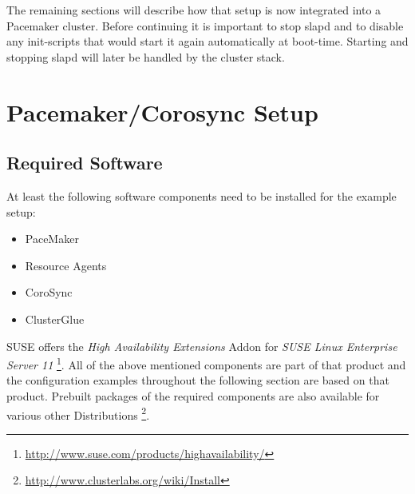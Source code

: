 \documentclass[a4paper,11pt,DIV=12]{scrartcl}
\begin{document}
    The remaining sections will describe how that setup is now integrated into
    a Pacemaker cluster. Before continuing it is important to stop slapd and to
    disable any init-scripts that would start it again automatically at
    boot-time.  Starting and stopping slapd will later be handled by the
    cluster stack.

\section{Pacemaker/Corosync Setup}

\subsection{Required Software}
    At least the following software components need to be installed for the
    example setup:
    \begin{itemize}
        \item PaceMaker
        \item Resource Agents
        \item CoroSync
        \item ClusterGlue
    \end{itemize}
    SUSE offers the \emph{High Availability Extensions} Addon for
    \emph{SUSE Linux Enterprise Server 11}
    \footnote{\url{http://www.suse.com/products/highavailability/}}. All
    of the above mentioned components are part of that product and the
    configuration examples  throughout the following section are based on
    that product.
    Prebuilt packages of the required components are also available for various
    other Distributions
    \footnote{\url{http://www.clusterlabs.org/wiki/Install}}.
\end{document}
